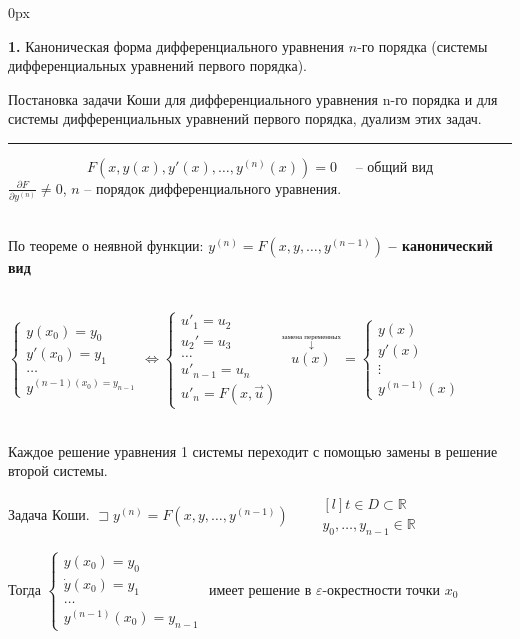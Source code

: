 
\parindent 0px


    \textbf{1.} Каноническая форма дифференциального уравнения $n$-го порядка 
    (системы дифференциальных уравнений первого порядка). 

    Постановка задачи Коши для дифференциального уравнения n-го 
    порядка и для системы дифференциальных уравнений
    первого порядка, дуализм этих задач.
    
    \rule{\textwidth}{1px}
    
    \par $ $
    $$F(x, y(x), y'(x), \dotsc, y^{(n)}(x)) = 0 \quad\textbf{ -- общий вид}$$
    $\displaystyle\frac{\partial F}{\partial y^{(n)}} \neq 0$, 
    $n$ -- порядок дифференциального уравнения. 
    
    \,\\
    По теореме о неявной функции: $y^{(n)} = F(x, y, \dotsc, y^{(n-1)})$
    \textbf{-- канонический вид}


    \,\\
    $
    \begin{cases}
        y(x_0) = y_0 \\
        y'(x_0) = y_1 \\
        \dotsc \\
        y^{(n-1)(x_0) = y_{n-1}}
    \end{cases}
    \iff
    \begin{cases}
        u'_1=u_2 \\
        u_2'=u_3 \\
        \dotsc \\
        u'_{n-1} = u_n \\
        u'_n = F(x, \vec{u})
    \end{cases}
    \overset{\overset{\text{замена переменных}}{\downarrow}}{u(x)}= 
    \begin{cases}
        y(x) \\
        y'(x) \\
        \vdots \\
        y^{(n-1)}(x)
    \end{cases}
    $

    \,\\
    Каждое решение уравнения 1 системы переходит с помощью замены 
    в решение второй системы.

    Задача Коши.
    $\sqsupset y^{(n)} = F(x, y, \dotsc, y^{(n-1)}) \qquad 
    \begin{matrix*}[l]
        t \in D \subset \mathbb{R} \\ y_0, \dotsc, y_{n-1} \in \mathbb{R}
    \end{matrix*}$
    
    Тогда 
    $\begin{cases}
        y(x_0) = y_0 \\
        \dot{y}(x_0) = y_1 \\
        \dotsc \\
        y^{(n-1)}(x_0) = y_{n-1}
    \end{cases}$ имеет решение в $\varepsilon$-окрестности точки $x_0$
